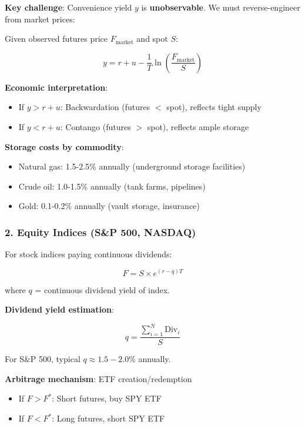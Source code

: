 \documentclass[12pt,a4paper]{article}
\begin{document}
\textbf{Key challenge}: Convenience yield $y$ is \textbf{unobservable}. We must reverse-engineer from market prices:

Given observed futures price $F_{\text{market}}$ and spot $S$:

\begin{equation}
y = r + u - \frac{1}{T} \ln\left(\frac{F_{\text{market}}}{S}\right)
\end{equation}

\textbf{Economic interpretation}:
\begin{itemize}
    \item If $y > r + u$: Backwardation (futures $<$ spot), reflects tight supply
    \item If $y < r + u$: Contango (futures $>$ spot), reflects ample storage
\end{itemize}

\textbf{Storage costs by commodity}:
\begin{itemize}
    \item Natural gas: 1.5-2.5\% annually (underground storage facilities)
    \item Crude oil: 1.0-1.5\% annually (tank farms, pipelines)
    \item Gold: 0.1-0.2\% annually (vault storage, insurance)
\end{itemize}

\subsubsection{2. Equity Indices (S\&P 500, NASDAQ)}

For stock indices paying continuous dividends:

\begin{equation}
F = S \times e^{(r - q)T}
\end{equation}

where $q$ = continuous dividend yield of index.

\textbf{Dividend yield estimation}:

\begin{equation}
q = \frac{\sum_{i=1}^{N} \text{Div}_i}{S}
\end{equation}

For S\&P 500, typical $q \approx 1.5-2.0\%$ annually.

\textbf{Arbitrage mechanism}: ETF creation/redemption
\begin{itemize}
    \item If $F > F^*$: Short futures, buy SPY ETF
    \item If $F < F^*$: Long futures, short SPY ETF
\end{itemize}
\end{document}
